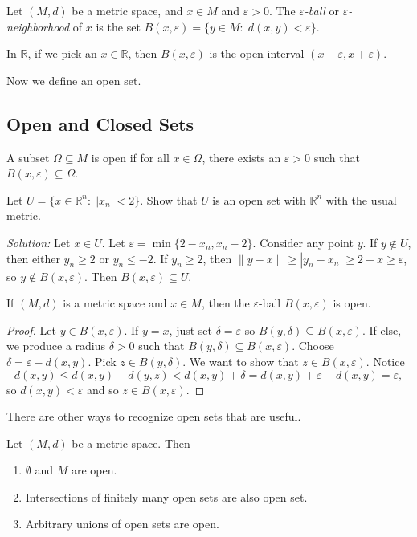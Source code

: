 \documentclass[11pt]{article}
\theoremstyle{definition}
\newcommand{\R}{\mathbb{R}}                      %
\begin{document}
 Let $(M,d)$ be a metric space, and $x\in M$ and $\varepsilon>0$. The \textit{$\varepsilon$-ball} or \textit{$\varepsilon$-neighborhood} of $x$ is the set $B(x,\varepsilon)=\{y\in M:\;d(x,y)<\varepsilon\}$.

\ex In $\R$, if we pick an $x\in \R$, then $B(x,\varepsilon)$ is the open interval $(x-\varepsilon,x+\varepsilon)$.

Now we define an open set.

\subsection{Open and Closed Sets}

 A subset $\Omega\subseteq M$ is open if for all $x\in\Omega$, there exists an $\varepsilon>0$ such that $B(x,\varepsilon)\subseteq \Omega$.

\ex Let $U=\{x\in\R^n : \;|x_n|<2\}$. Show that $U$ is an open set with $\R^n$ with the usual metric.

\textit{Solution:} Let $x\in U$. Let $\varepsilon=\min \{2-x_n,x_n-2\}$. Consider any point $y$. If $y\not\in U$, then either $y_n\geq 2$ or $y_n\leq -2$. If $y_n\geq 2$, then $\|y-x\|\geq |y_n-x_n|\geq 2-x\geq \varepsilon$, so $y\not\in B(x,\varepsilon)$. Then $B(x,\varepsilon)\subseteq U$.

\prop If $(M,d)$ is a metric space and $x\in M$, then the $\varepsilon$-ball $B(x,\varepsilon)$ is open.

\begin{proof}
    Let $y\in B(x,\varepsilon)$. If $y=x$, just set $\delta=\varepsilon$ so $B(y,\delta)\subseteq B(x,\varepsilon)$. If else, we produce a radius $\delta>0$ such that $B(y,\delta)\subseteq B(x,\varepsilon)$. Choose $\delta=\varepsilon-d(x,y)$. Pick $z\in B(y,\delta)$. We want to show that $z\in B(x,\varepsilon)$. Notice
    $$
    d(x,y)\leq d(x,y)+d(y,z)<d(x,y)+\delta=d(x,y)+\varepsilon-d(x,y)=\varepsilon,
    $$
    so $d(x,y)<\varepsilon$ and so $z\in B(x,\varepsilon)$.
\end{proof}

There are other ways to recognize open sets that are useful.

\prop Let $(M,d)$ be a metric space. Then
\begin{enumerate}
    \item $\emptyset$ and $M$ are open.
    \item Intersections of finitely many open sets are also open set.
    \item Arbitrary unions of open sets are open.
\end{enumerate}
\end{document}
